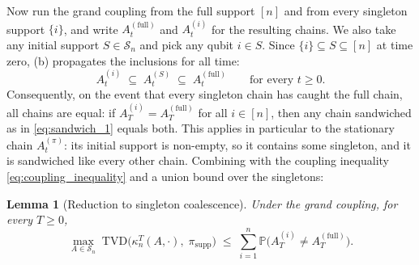 \documentclass[
    aps,
    superscriptaddress,
    onecolumn,
    10pt,
    prx,
    nofootinbib
]{revtex4-2}
\newtheorem{lemma}{Lemma}
\theoremstyle{namedstatement}
\theoremstyle{plain}
\begin{document}
Now run the grand coupling from the full support $[n]$ and from every singleton support $\{i\}$, and write $A^{(\mathrm{full})}_t$ and $A^{(i)}_t$ for the resulting chains. We also take any initial support $S \in \mathcal{S}_n$ and pick any qubit $i \in S$. Since $\{i\} \subseteq S \subseteq [n]$ at time zero, (b) propagates the inclusions for all time:
\begin{equation}\label{eq:sandwich_1}
    A^{(i)}_t \;\subseteq\; A^{(S)}_t \;\subseteq\; A^{(\mathrm{full})}_t
    \qquad \text{for every } t \ge 0.
\end{equation}
Consequently, on the event that every singleton chain has caught the full chain, all chains are equal: if $A^{(i)}_T = A^{(\mathrm{full})}_T$ for all $i \in [n]$, then any chain sandwiched as in \cref{eq:sandwich_1} equals both. This applies in particular to the stationary chain $A^{(\pi)}_t$: its initial support is non-empty, so it contains some singleton, and it is sandwiched like every other chain. Combining with the coupling inequality \cref{eq:coupling_inequality} and a union bound over the singletons:

\begin{lemma}[Reduction to singleton coalescence]\label{lem:singleton_reduction}
Under the grand coupling, for every $T \ge 0$,
\begin{equation}\label{eq:singleton_reduction}
    \max_{A \in \mathcal{S}_n}\; \mathrm{TVD}\big( \kappa_n^{T}(A,\cdot),\; \pi_{\mathrm{supp}} \big)
    \;\le\;
    \sum_{i=1}^{n} \mathbb{P}\big( A^{(i)}_T \neq A^{(\mathrm{full})}_T \big).
\end{equation}
\end{lemma}
\end{document}
